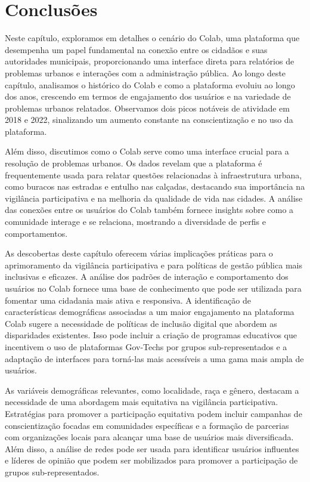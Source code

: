 \section{Conclusões}
Neste capítulo, exploramos em detalhes o cenário do Colab, uma plataforma que desempenha um papel fundamental na conexão entre os cidadãos e suas autoridades municipais, proporcionando uma interface direta para relatórios de problemas urbanos e interações com a administração pública. Ao longo deste capítulo, analisamos o histórico do Colab e como a plataforma evoluiu ao longo dos anos, crescendo em termos de engajamento dos usuários e na variedade de problemas urbanos relatados. Observamos dois picos notáveis de atividade em 2018 e 2022, sinalizando um aumento constante na conscientização e no uso da plataforma.

Além disso, discutimos como o Colab serve como uma interface crucial para a resolução de problemas urbanos. Os dados revelam que a plataforma é frequentemente usada para relatar questões relacionadas à infraestrutura urbana, como buracos nas estradas e entulho nas calçadas, destacando sua importância na vigilância participativa e na melhoria da qualidade de vida nas cidades. A análise das conexões entre os usuários do Colab também fornece insights sobre como a comunidade interage e se relaciona, mostrando a diversidade de perfis e comportamentos.

As descobertas deste capítulo oferecem várias implicações práticas para o aprimoramento da vigilância participativa e para políticas de gestão pública mais inclusivas e eficazes. A análise dos padrões de interação e comportamento dos usuários no Colab fornece uma base de conhecimento que pode ser utilizada para fomentar uma cidadania mais ativa e responsiva. A identificação de características demográficas associadas a um maior engajamento na plataforma Colab sugere a necessidade de políticas de inclusão digital que abordem as disparidades existentes. Isso pode incluir a criação de programas educativos que incentivem o uso de plataformas Gov-Techs por grupos sub-representados e a adaptação de interfaces para torná-las mais acessíveis a uma gama mais ampla de usuários.

As variáveis demográficas relevantes, como localidade, raça e gênero, destacam a necessidade de uma abordagem mais equitativa na vigilância participativa. Estratégias para promover a participação equitativa podem incluir campanhas de conscientização focadas em comunidades específicas e a formação de parcerias com organizações locais para alcançar uma base de usuários mais diversificada. Além disso, a análise de redes pode ser usada para identificar usuários influentes e líderes de opinião que podem ser mobilizados para promover a participação de grupos sub-representados.

